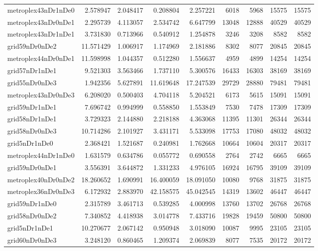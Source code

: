 \begin{longtable}{|l|r|r|r|r|r|r|r|r|}
metroplex43nDr1nDe0 & 2.578947 & 2.048417 & 0.208804 & 2.257221 & 6018 & 5968 & 15575 & 15575 \\
metroplex43nDr0nDe1 & 2.295739 & 4.113057 & 2.534742 & 6.647799 & 13048 & 12888 & 40529 & 40529 \\
metroplex43nDr1nDe1 & 3.731830 & 0.713966 & 0.540912 & 1.254878 & 3246 & 3208 & 8582 & 8582 \\
grid59nDr0nDe2 & 11.571429 & 1.006917 & 1.174969 & 2.181886 & 8302 & 8077 & 20845 & 20845 \\
metroplex44nDr0nDe1 & 11.598998 & 1.044357 & 0.512280 & 1.556637 & 4959 & 4899 & 14254 & 14254 \\
grid57nDr1nDe1 & 9.521303 & 3.563466 & 1.737110 & 5.300576 & 16433 & 16303 & 38169 & 38169 \\
grid55nDr0nDe3 & 1.942356 & 5.627891 & 11.619648 & 17.247539 & 29729 & 28880 & 79481 & 79481 \\
metroplex43nDr0nDe3 & 6.208020 & 0.500403 & 4.704118 & 5.204521 & 6173 & 5615 & 15091 & 15091 \\
grid59nDr1nDe1 & 7.696742 & 0.994999 & 0.558850 & 1.553849 & 7530 & 7478 & 17309 & 17309 \\
grid58nDr1nDe1 & 3.729323 & 2.144880 & 2.218188 & 4.363068 & 11395 & 11301 & 26344 & 26344 \\
grid58nDr0nDe3 & 10.714286 & 2.101927 & 3.431171 & 5.533098 & 17753 & 17080 & 48032 & 48032 \\
grid5nDr1nDe0 & 2.368421 & 1.521687 & 0.240981 & 1.762668 & 10664 & 10604 & 20317 & 20317 \\
metroplex44nDr1nDe0 & 1.631579 & 0.634786 & 0.055772 & 0.690558 & 2764 & 2742 & 6665 & 6665 \\
grid59nDr0nDe1 & 3.556391 & 3.644872 & 1.331233 & 4.976105 & 16924 & 16795 & 39109 & 39109 \\
metroplex40nDr0nDe2 & 18.260652 & 1.690991 & 16.400059 & 18.091050 & 10080 & 9768 & 31875 & 31875 \\
metroplex36nDr0nDe3 & 6.172932 & 2.883970 & 42.158575 & 45.042545 & 14319 & 13602 & 46447 & 46447 \\
grid59nDr1nDe0 & 2.315789 & 3.461713 & 0.539285 & 4.000998 & 13760 & 13702 & 26768 & 26768 \\
grid58nDr0nDe2 & 7.340852 & 4.418938 & 3.014778 & 7.433716 & 19828 & 19459 & 50800 & 50800 \\
grid5nDr1nDe1 & 10.270677 & 2.067142 & 0.950948 & 3.018090 & 10087 & 9995 & 23105 & 23105 \\
grid60nDr0nDe3 & 3.248120 & 0.860465 & 1.209374 & 2.069839 & 8077 & 7535 & 20172 & 20172 \\

\end{longtable}
